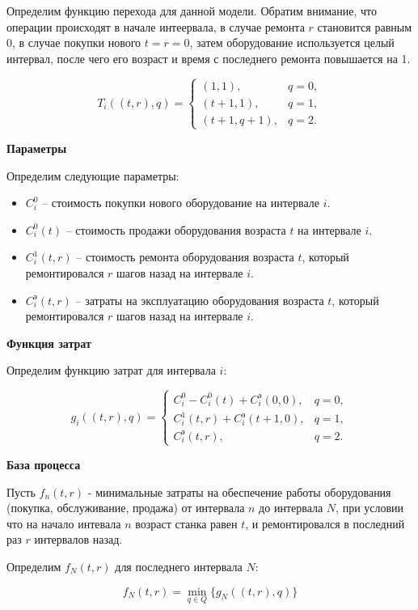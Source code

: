 Определим функцию перехода для данной модели. Обратим внимание, что операции происходят в начале интеервала, в случае ремонта $r$ становится равным 0, в случае покупки нового $t = r = 0$, затем оборудование используется целый интервал, после чего его возраст и время с последнего ремонта повышается на 1.

\[
T_i((t, r), q) = 
\begin{cases}
	(1, 1), & q = 0, \\
	(t+1, 1), & q = 1, \\
	(t+1, q+1), & q = 2.
\end{cases}
\]


\bigskip

\textbf{Параметры}

Определим следующие параметры:
\begin{itemize}[nosep]
	\item $C_i^0$ -- стоимость покупки нового оборудование на интервале $i$.
	\item $C_i^0(t)$ -- стоимость продажи оборудования возраста $t$ на интервале $i$.
	\item $C_i^1(t, r)$ -- стоимость ремонта оборудования возраста $t$, который ремонтировался $r$ шагов назад на интервале $i$.
	\item $C_i^\text{э} (t,r)$ -- затраты на эксплуатацию оборудования возраста $t$, который ремонтировался $r$ шагов назад на интервале $i$.
\end{itemize}

\bigskip

\textbf{Функция затрат}

Определим функцию затрат для интервала $i$:

\[
g_i((t, r), q) = 
\begin{cases}
	C_i^0 - C_i^0(t) + C_i^\text{э} (0,0), & q = 0, \\
	C_i^1(t,r) + C_i^\text{э} (t+1,0), & q = 1, \\
	C_i^\text{э} (t,r), & q = 2.
\end{cases}
\]

\textbf{База процесса}

Пусть $f_n(t, r)$ - минимальные затраты на обеспечение работы оборудования (покупка, обслуживание, продажа) от интервала $n$ до интервала $N$, при условии что на начало интевала $n$ возраст станка равен $t$, и ремонтировался в последний раз $r$ интервалов назад.

Определим $f_N(t, r)$ для последнего интервала $N$:

\[
\boxed{ f_N(t,r) = \min_{q \in Q} \Big\{ g_N((t,r), q) \Big\} }
\]

